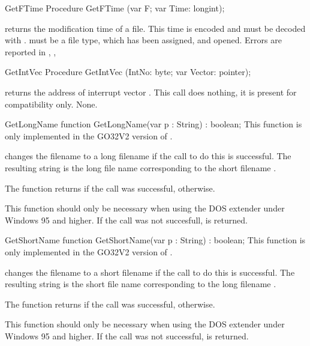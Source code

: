 
\begin{procedure}{GetFTime}
\Declaration
Procedure GetFTime (var F; var Time: longint);
\Description

 returns the modification time of a file.
This time is encoded and must be decoded with . 
 must be a file type, which has been assigned, and
opened.
\Errors
Errors are reported in 
\SeeAlso
{}, ,
\end{procedure}


\begin{procedure}{GetIntVec}
\Declaration
Procedure GetIntVec (IntNo: byte; var Vector: pointer);
\Description

 returns the address of interrupt vector
.
\Portability
This call does nothing, it is present for compatibility only.
\Errors
None.
\SeeAlso
{}
\end{procedure}

\begin{function}{GetLongName}
\Declaration
function GetLongName(var p : String) : boolean;\Description
This function is only implemented in the GO32V2 version of \fpc.

 changes the filename  to a long filename
if the \dos call to do this is successful. The resulting string
is the long  file name corresponding to the short filename .

The function returns  if the \dos call was successful, 
 otherwise.

This function should only be necessary when using the DOS extender
under Windows 95 and higher.
\Errors
If the \dos call was not succesfull,  is returned.
\SeeAlso
{}
\end{function}

\begin{function}{GetShortName}
\Declaration
function GetShortName(var p : String) : boolean;\Description
This function is only implemented in the GO32V2 version of \fpc.

 changes the filename  to a short filename
if the \dos call to do this is successful. The resulting string
is the short file name corresponding to the long filename .

The function returns  if the \dos call was successful, 
 otherwise.

This function should only be necessary when using the DOS extender
under Windows 95 and higher.
\Errors
If the \dos call was not successful,  is returned.
\SeeAlso
{}
\end{function}


